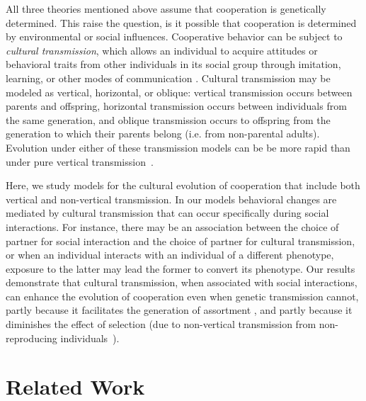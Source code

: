 \documentclass[12pt]{extarticle}
\begin{document}
All three theories mentioned above assume that cooperation is genetically determined. This raise the question, is it possible that cooperation is determined by environmental or social influences.
Cooperative behavior can be subject to \emph{cultural transmission}, which allows an individual to acquire attitudes or behavioral traits from other individuals in its social group through imitation, learning, or other modes of communication \citep{cavalli1981cultural,richerson2008not}.
Cultural transmission may be  modeled as vertical, horizontal, or oblique:  vertical transmission occurs between parents and offspring, horizontal transmission occurs between individuals from the same generation, and oblique transmission occurs  to offspring from the generation to which their parents belong (i.e. from non-parental adults). 
Evolution under either of these transmission models can be be more rapid than under pure vertical transmission~\citep{cavalli1981cultural,lycett2008questions,ram2018evolution}.

Here, we study models for the cultural evolution of cooperation that include both vertical and non-vertical transmission. 
In our models behavioral changes are mediated by cultural transmission that can occur specifically during social interactions.
For instance, there may be an association between the choice of partner for social interaction and the choice of partner for cultural transmission,
or when an individual interacts with an individual of a different phenotype,  exposure to the latter may lead the former to  convert its phenotype.
Our results demonstrate that cultural transmission, when associated with social interactions, can enhance the evolution of cooperation even when genetic transmission cannot, partly because it facilitates the generation of assortment \citep{Fletcher2009assortment}, and partly because it diminishes the effect of selection (due to non-vertical transmission from non-reproducing individuals~\citep{ram2018evolution}).

\newpage
\section{Related Work}
\end{document}
